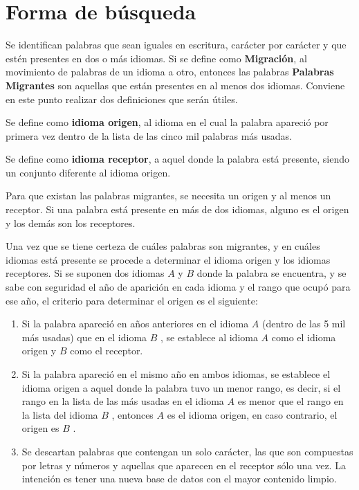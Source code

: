 \section{Forma de búsqueda}

Se identifican palabras que sean iguales en escritura, carácter por carácter y que estén presentes en dos o más idiomas.  Si se define como  \textbf{Migración}, al movimiento de palabras de un idioma a otro, entonces las palabras \textbf{Palabras Migrantes}  son aquellas que están presentes en al menos dos idiomas.  Conviene en este punto realizar dos definiciones que serán útiles.

\hfill \break

Se define como  \textbf{idioma origen}, al idioma en el cual la palabra apareció por primera vez dentro de la lista de las cinco mil palabras más usadas.  

\hfill \break 

Se define como \textbf{idioma receptor}, a  aquel donde la palabra está presente, siendo un conjunto diferente al idioma origen.  

\hfill \break

Para que existan las palabras migrantes, se necesita un origen y al menos un receptor. Si una palabra está presente en más de dos idiomas, alguno es el origen y los demás son los receptores. 

Una vez que se tiene certeza de cuáles palabras son migrantes, y en cuáles idiomas está presente se procede a determinar el idioma origen y los idiomas receptores.   Si se suponen dos idiomas $\textit{A}$ y $\textit{B}$  donde la palabra se encuentra, y se sabe con seguridad el año de aparición en cada idioma y el rango que ocupó para ese año,  el criterio para determinar el origen es el siguiente: 


\begin{enumerate}
	
	\item  Si la palabra apareció en años anteriores en el idioma $\textit{A}$  (dentro de las 5 mil más usadas) que en el idioma $\textit{B}$ , se establece al idioma $\textit{A}$  como el idioma origen y $\textit{B}$  como el receptor.
	
	\item Si la palabra apareció en el mismo año en ambos idiomas, se establece el idioma origen a aquel donde la palabra tuvo un menor rango, es decir, si el rango en la lista de las más usadas en el idioma $\textit{A}$  es menor que el rango en la lista del idioma $\textit{B}$ , entonces $\textit{A}$  es el idioma origen, en caso contrario, el origen es $\textit{B}$ .
	
	\item Se descartan palabras que contengan un solo carácter, las que son compuestas por letras y números y aquellas que aparecen en el receptor sólo una vez. La intención es tener una  nueva base de datos con el mayor contenido limpio. 
	
\end{enumerate}

